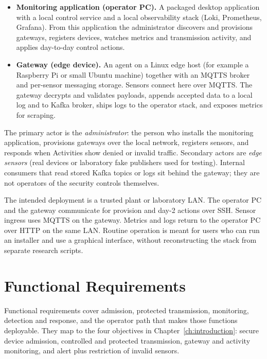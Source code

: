 \documentclass[12pt,a4paper]{report}
\begin{document}
\begin{itemize}
    \item \textbf{Monitoring application (operator PC).}
    A packaged desktop application with a local control
    service and a local observability stack
    (Loki, Prometheus, Grafana). From this application
    the administrator discovers and provisions gateways,
    registers devices, watches metrics and transmission
    activity, and applies day-to-day control actions.
    \item \textbf{Gateway (edge device).}
    An agent on a Linux edge host (for example a
    Raspberry Pi or small Ubuntu machine) together with
    an MQTTS broker and per-sensor messaging storage.
    Sensors connect here over MQTTS. The gateway
    decrypts and validates payloads, appends accepted
    data to a local log and to Kafka broker, ships logs
    to the operator stack, and exposes metrics for
    scraping.
\end{itemize}

The primary actor is the \emph{administrator}: the
person who installs the monitoring application,
provisions gateways over the local network, registers
sensors, and responds when Activities show denied or
invalid traffic. Secondary actors are \emph{edge
sensors} (real devices or laboratory fake publishers
used for testing). Internal consumers that read stored
Kafka topics or logs sit behind the gateway; they are
not operators of the security controls themselves.

The intended deployment is a trusted plant or laboratory
LAN. The operator PC and the gateway communicate for
provision and day-2 actions over SSH. Sensor ingress
uses MQTTS on the gateway. Metrics and logs return to
the operator PC over HTTP on the same LAN. Routine
operation is meant for users who can run an installer
and use a graphical interface, without reconstructing
the stack from separate research scripts.

\section{Functional Requirements}

Functional requirements cover admission, protected
transmission, monitoring, detection and response, and
the operator path that makes those functions deployable.
They map to the four objectives in
Chapter~\ref{ch:introduction}: secure device admission,
controlled and protected transmission, gateway and
activity monitoring, and alert plus restriction of
invalid sensors.
\end{document}
